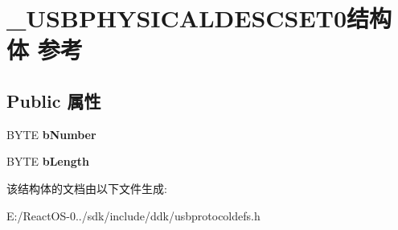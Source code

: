 \hypertarget{struct___u_s_b_p_h_y_s_i_c_a_l_d_e_s_c_s_e_t0}{}\section{\+\_\+\+U\+S\+B\+P\+H\+Y\+S\+I\+C\+A\+L\+D\+E\+S\+C\+S\+E\+T0结构体 参考}
\label{struct___u_s_b_p_h_y_s_i_c_a_l_d_e_s_c_s_e_t0}
\subsection*{Public 属性}
\begin{DoxyCompactItemize}
\item 
\mbox{\label{struct___u_s_b_p_h_y_s_i_c_a_l_d_e_s_c_s_e_t0_a37cb1675c32bbb4fdefaf2bdc11a179e}} 
B\+Y\+TE {\bfseries b\+Number}
\item 
\mbox{\label{struct___u_s_b_p_h_y_s_i_c_a_l_d_e_s_c_s_e_t0_a05373252acc78fe41f511c1c910bdd00}} 
B\+Y\+TE {\bfseries b\+Length}
\end{DoxyCompactItemize}


该结构体的文档由以下文件生成\+:\begin{DoxyCompactItemize}
\item 
E\+:/\+React\+O\+S-\/0../sdk/include/ddk/usbprotocoldefs.\+h\end{DoxyCompactItemize}
